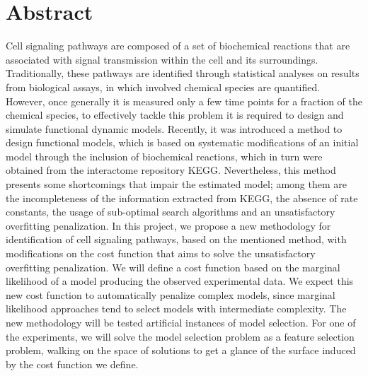 \documentclass[12pt, twoside]{report}
\numberwithin{mydefinition}{section}
\numberwithin{mytheorem}{section}
\numberwithin{mylemma}{section}
\numberwithin{corollary}{section}
\begin{document}
\chapter*{Abstract}
Cell signaling pathways are composed of a set of biochemical reactions 
that are associated with signal transmission within the cell and its 
surroundings. Traditionally, these pathways are identified through 
statistical analyses on results from biological assays, in which 
involved chemical species are quantified. However, once generally it is 
measured only a few time points for a fraction of the chemical species, 
to effectively tackle this problem it is required to design and simulate 
functional dynamic models. Recently, it was introduced a method to 
design functional models, which is based on systematic modifications of 
an initial model through the inclusion of biochemical reactions, which 
in turn were obtained from the interactome repository KEGG. 
Nevertheless, this method presents some shortcomings that impair the 
estimated model; among them are the incompleteness of the information 
extracted from KEGG, the absence of rate constants, the usage of 
sub-optimal search algorithms and an unsatisfactory overfitting 
penalization. In this project, we propose a new methodology for 
identification of cell signaling pathways, based on the mentioned
method, with modifications on the cost function that aims to solve the
unsatisfactory overfitting penalization. We will define a cost function
based on the marginal likelihood of a model producing the observed
experimental data. We expect this new cost function to automatically
penalize complex models, since marginal likelihood approaches tend to 
select models with intermediate complexity. The new methodology will be 
tested artificial instances of model selection. For one of the
experiments, we will solve the model selection problem as a feature
selection problem, walking on the space of solutions to get a glance of
the surface induced by the cost function we define.
\end{document}
